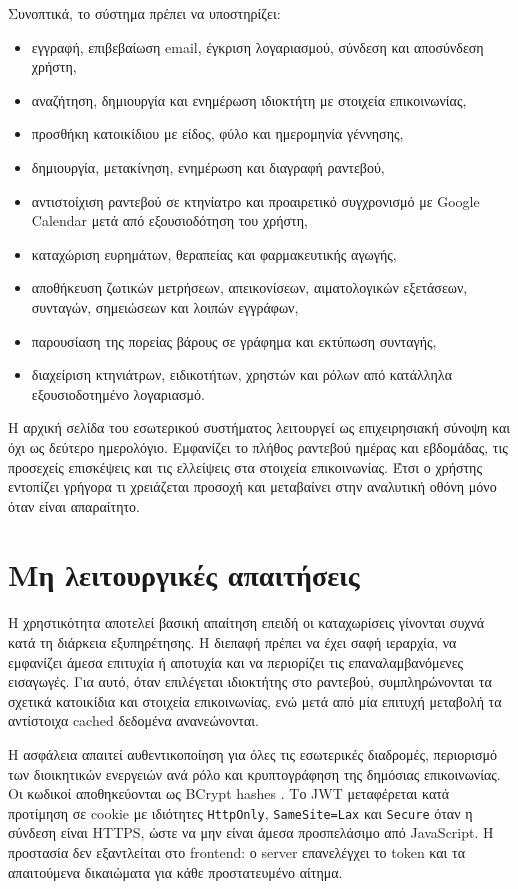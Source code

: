 Συνοπτικά, το σύστημα πρέπει να υποστηρίζει:

\begin{itemize}
  \item εγγραφή, επιβεβαίωση email, έγκριση λογαριασμού, σύνδεση και
        αποσύνδεση χρήστη,
  \item αναζήτηση, δημιουργία και ενημέρωση ιδιοκτήτη με στοιχεία
        επικοινωνίας,
  \item προσθήκη κατοικίδιου με είδος, φύλο και ημερομηνία γέννησης,
  \item δημιουργία, μετακίνηση, ενημέρωση και διαγραφή ραντεβού,
  \item αντιστοίχιση ραντεβού σε κτηνίατρο και προαιρετικό συγχρονισμό με
        Google Calendar μετά από εξουσιοδότηση του χρήστη,
  \item καταχώριση ευρημάτων, θεραπείας και φαρμακευτικής αγωγής,
  \item αποθήκευση ζωτικών μετρήσεων, απεικονίσεων, αιματολογικών εξετάσεων,
        συνταγών, σημειώσεων και λοιπών εγγράφων,
  \item παρουσίαση της πορείας βάρους σε γράφημα και εκτύπωση συνταγής,
  \item διαχείριση κτηνιάτρων, ειδικοτήτων, χρηστών και ρόλων από κατάλληλα
        εξουσιοδοτημένο λογαριασμό.
\end{itemize}

Η αρχική σελίδα του εσωτερικού συστήματος λειτουργεί ως επιχειρησιακή σύνοψη
και όχι ως δεύτερο ημερολόγιο. Εμφανίζει το πλήθος ραντεβού ημέρας και
εβδομάδας, τις προσεχείς επισκέψεις και τις ελλείψεις στα στοιχεία
επικοινωνίας. Έτσι ο χρήστης εντοπίζει γρήγορα τι χρειάζεται προσοχή και
μεταβαίνει στην αναλυτική οθόνη μόνο όταν είναι απαραίτητο.

\section{Μη λειτουργικές απαιτήσεις}

Η χρηστικότητα αποτελεί βασική απαίτηση επειδή οι καταχωρίσεις γίνονται
συχνά κατά τη διάρκεια εξυπηρέτησης. Η διεπαφή πρέπει να έχει σαφή ιεραρχία,
να εμφανίζει άμεσα επιτυχία ή αποτυχία και να περιορίζει τις επαναλαμβανόμενες
εισαγωγές. Για αυτό, όταν επιλέγεται ιδιοκτήτης στο ραντεβού, συμπληρώνονται
τα σχετικά κατοικίδια και στοιχεία επικοινωνίας, ενώ μετά από μία επιτυχή
μεταβολή τα αντίστοιχα cached δεδομένα ανανεώνονται.

Η ασφάλεια απαιτεί αυθεντικοποίηση για όλες τις εσωτερικές διαδρομές,
περιορισμό των διοικητικών ενεργειών ανά ρόλο και κρυπτογράφηση της δημόσιας
επικοινωνίας. Οι κωδικοί αποθηκεύονται ως BCrypt hashes
\cite{owasp2026passwordstorage}. Το JWT μεταφέρεται
κατά προτίμηση σε cookie με ιδιότητες \texttt{HttpOnly}, \texttt{SameSite=Lax}
και \texttt{Secure} όταν η σύνδεση είναι HTTPS, ώστε να μην είναι άμεσα
προσπελάσιμο από JavaScript. Η προστασία δεν εξαντλείται στο frontend: ο
server επανελέγχει το token και τα απαιτούμενα δικαιώματα για κάθε
προστατευμένο αίτημα.


